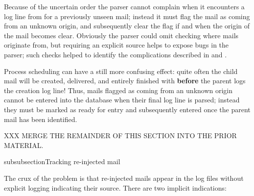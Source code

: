 Because of the uncertain order the parser cannot complain when it
encounters a log line from  for a previously unseen mail;
instead it must flag the mail as coming from an unknown origin, and
subsequently clear the flag if and when the origin of the mail becomes
clear.  Obviously the parser could omit checking where mails originate
from, but requiring an explicit source helps to expose bugs in the parser;
such checks helped to identify the complications described in
 and .

Process scheduling can have a still more confusing effect: quite often the
child mail will be created, delivered, and entirely finished with
\textbf{before} the parent logs the creation log line!  Thus, mails flagged
as coming from an unknown origin cannot be entered into the database when
their final log line is parsed; instead they must be marked as ready for
entry and subsequently entered once the parent mail has been identified.

XXX MERGE THE REMAINDER OF THIS SECTION INTO THE PRIOR MATERIAL\@.

subsubsection{Tracking re-injected mail}

\label{tracking re-injected mail}

The crux of the problem is that re-injected mails appear in the log files
without explicit logging indicating their source.  There are two implicit
indications:

